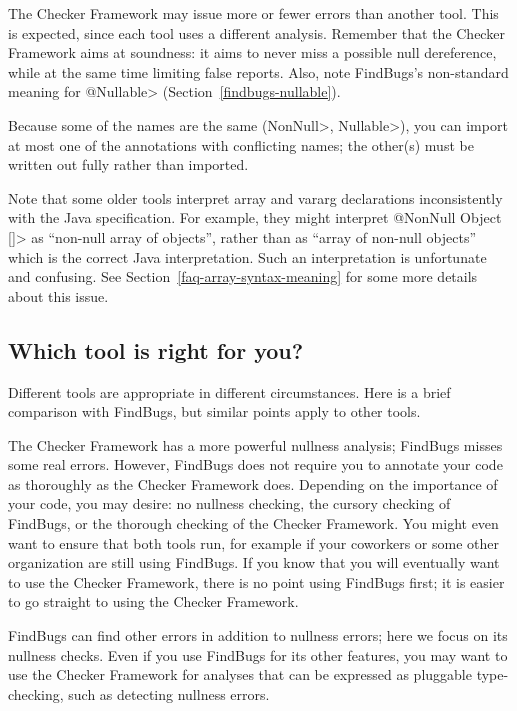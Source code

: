 The Checker Framework may issue more or fewer errors than another tool.
This is expected, since each tool uses a different analysis.  Remember that
the Checker Framework aims at soundness:  it aims to never miss a possible
null dereference, while at the same time limiting false reports.  Also,
note FindBugs's non-standard meaning for \<@Nullable>
(Section~\ref{findbugs-nullable}).

Because some of the names are the same (\<NonNull>, \<Nullable>), you can
import at most one of the annotations with
conflicting names; the other(s) must be written out fully rather than
imported.

Note that some older tools interpret array and vararg declarations
inconsistently with the Java specification.  For example, they might
interpret \<@NonNull Object []> as ``non-null array of objects'', rather
than as ``array of non-null objects'' which is the correct Java
interpretation.  Such an interpretation is unfortunate and confusing.  See
Section~\ref{faq-array-syntax-meaning} for some more details about this
issue.


\subsection{Which tool is right for you?\label{choosing-nullness-tool}}

Different tools are appropriate in different circumstances.  Here is a
brief comparison with FindBugs, but similar points apply to other tools.

The Checker Framework has a more powerful nullness analysis; FindBugs misses
some real
errors.  However, FindBugs does not require you to annotate your code as
thoroughly as the Checker Framework does.  Depending on the importance of
your code, you may desire:  no nullness checking, the cursory checking of
FindBugs, or the thorough checking of the Checker Framework.  You might
even want to ensure that both tools run, for example if your coworkers or
some other organization are still using FindBugs.  If you know that you
will eventually want to use the Checker Framework, there is no point using
FindBugs first; it is easier to go straight to using the Checker Framework.

FindBugs can find other errors in addition to nullness errors; here
we focus on its nullness checks.  Even if you use FindBugs for its other
features, you may want to use the Checker Framework for analyses that can
be expressed as pluggable type-checking, such as detecting nullness errors.

